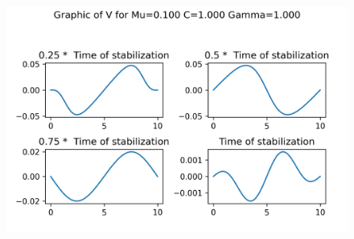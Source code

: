 \begin{figure}[H]
	\includegraphics[scale=0.5]{../graphs_data_nonsmooth_1/slices/Graph_V_mu0.100_C1.000_gamma1.000.png}
\end{figure}

